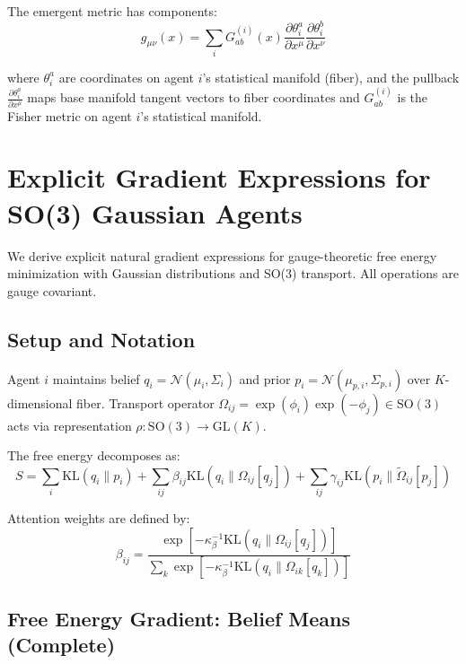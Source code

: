 \documentclass[11pt]{article}
\begin{document}
The emergent metric has components:
\begin{equation}
g_{\mu\nu}(x) = \sum_i G_{ab}^{(i)}(x) \frac{\partial \theta_i^a}{\partial x^\mu} \frac{\partial \theta_i^b}{\partial x^\nu}
\end{equation}

where $\theta_i^a$ are coordinates on agent $i$'s statistical manifold 
(fiber), and the pullback $\frac{\partial \theta_i^a}{\partial x^\mu}$ 
maps base manifold tangent vectors to fiber coordinates and $G_{ab}^{(i)}$ is the Fisher metric on agent $i$'s statistical manifold.



\section*{Explicit Gradient Expressions for SO(3) Gaussian Agents}

We derive explicit natural gradient expressions for gauge-theoretic free energy minimization with Gaussian distributions and SO(3) transport. All operations are gauge covariant.

\subsection*{Setup and Notation}

Agent $i$ maintains belief $q_i = \mathcal{N}(\mu_i, \Sigma_i)$ and prior $p_i = \mathcal{N}(\mu_{p,i}, \Sigma_{p,i})$ over $K$-dimensional fiber. Transport operator $\Omega_{ij} = \exp(\phi_i)\exp(-\phi_j) \in \mathrm{SO}(3)$ acts via representation $\rho: \mathrm{SO}(3) \to \mathrm{GL}(K)$.

The free energy decomposes as:
\begin{equation}
S = \sum_i \mathrm{KL}(q_i \| p_i) + \sum_{ij} \beta_{ij} \mathrm{KL}(q_i \| \Omega_{ij}[q_j]) + \sum_{ij} \gamma_{ij} \mathrm{KL}(p_i \| \tilde{\Omega}_{ij}[p_j])
\end{equation}

Attention weights are defined by:
\begin{equation}
\beta_{ij} = \frac{\exp\left[-\kappa_\beta^{-1}\mathrm{KL}(q_i \| \Omega_{ij}[q_j])\right]}{\sum_k \exp\left[-\kappa_\beta^{-1}\mathrm{KL}(q_i \| \Omega_{ik}[q_k])\right]}
\end{equation}

\subsection*{Free Energy Gradient: Belief Means (Complete)}
\end{document}
